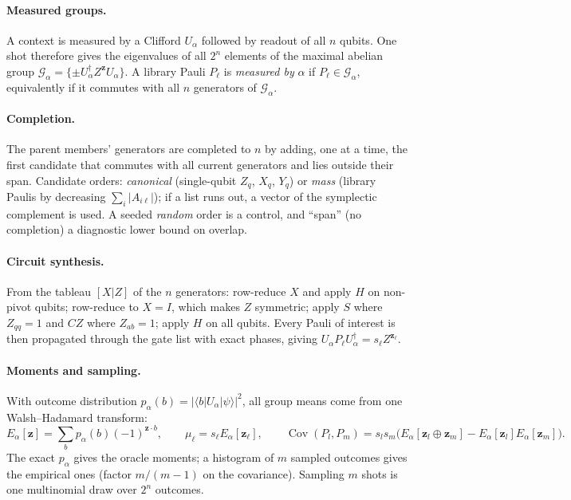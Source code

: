 \documentclass[10.5pt]{article}
\newcommand{\Cov}{\operatorname{Cov}}
\begin{document}
\paragraph{Measured groups.}
A context is measured by a Clifford $U_\alpha$ followed by readout of all $n$ qubits. One shot therefore gives the eigenvalues of all $2^n$ elements of the maximal abelian group $\mathcal G_\alpha=\{\pm U_\alpha^\dagger Z^{\bm z}U_\alpha\}$. A library Pauli $P_\ell$ is \emph{measured by} $\alpha$ if $P_\ell\in\mathcal G_\alpha$, equivalently if it commutes with all $n$ generators of $\mathcal G_\alpha$.

\paragraph{Completion.}
The parent members' generators are completed to $n$ by adding, one at a time, the first candidate that commutes with all current generators and lies outside their span. Candidate orders: \emph{canonical} (single-qubit $Z_q$, $X_q$, $Y_q$) or \emph{mass} (library Paulis by decreasing $\sum_i|A_{i\ell}|$); if a list runs out, a vector of the symplectic complement is used. A seeded \emph{random} order is a control, and ``span'' (no completion) a diagnostic lower bound on overlap.

\paragraph{Circuit synthesis.}
From the tableau $[X|Z]$ of the $n$ generators: row-reduce $X$ and apply $H$ on non-pivot qubits; row-reduce to $X=I$, which makes $Z$ symmetric; apply $S$ where $Z_{qq}=1$ and $CZ$ where $Z_{ab}=1$; apply $H$ on all qubits. Every Pauli of interest is then propagated through the gate list with exact phases, giving $U_\alpha P_\ell U_\alpha^\dagger=s_\ell Z^{\bm z_\ell}$.

\paragraph{Moments and sampling.}
With outcome distribution $p_\alpha(b)=|\langle b|U_\alpha|\psi\rangle|^2$, all group means come from one Walsh--Hadamard transform:
\begin{equation}
  E_\alpha[\bm z]=\sum_b p_\alpha(b)(-1)^{\bm z\cdot b},\qquad
  \mu_\ell=s_\ell E_\alpha[\bm z_\ell],\qquad
  \Cov(P_l,P_m)=s_ls_m\big(E_\alpha[\bm z_l\oplus\bm z_m]-E_\alpha[\bm z_l]E_\alpha[\bm z_m]\big).
  \label{eq:moments}
\end{equation}
The exact $p_\alpha$ gives the oracle moments; a histogram of $m$ sampled outcomes gives the empirical ones (factor $m/(m-1)$ on the covariance). Sampling $m$ shots is one multinomial draw over $2^n$ outcomes.
\end{document}
